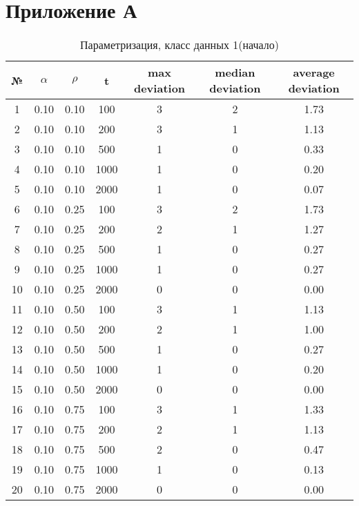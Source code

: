 \documentclass[a4paper, 12pt, unknownkeysallowed]{extreport}
\begin{document}
\chapter*{Приложение А}

\begin{center}
    \captionsetup{justification=raggedright,singlelinecheck=off}
    \begin{longtable}[c]{|c|c|c|c|c|c|c|}
    \caption{Параметризация, класс данных 1(начало)\label{tbl:p_1_1}} \\ \hline
		№ & $\alpha$ & $\rho$ & t & max deviation & median deviation & average deviation \\ \hline   
    1 & 0.10 & 0.10 &   100 &    3 &    2 &  1.73 \\ \hline
    2 & 0.10 & 0.10 &   200 &    3 &    1 &  1.13 \\ \hline
    3 & 0.10 & 0.10 &   500 &    1 &    0 &  0.33 \\ \hline
    4 & 0.10 & 0.10 &  1000 &    1 &    0 &  0.20 \\ \hline
    5 & 0.10 & 0.10 &  2000 &    1 &    0 &  0.07 \\ \hline
    6 & 0.10 & 0.25 &   100 &    3 &    2 &  1.73 \\ \hline
    7 & 0.10 & 0.25 &   200 &    2 &    1 &  1.27 \\ \hline
    8 & 0.10 & 0.25 &   500 &    1 &    0 &  0.27 \\ \hline
    9 & 0.10 & 0.25 &  1000 &    1 &    0 &  0.27 \\ \hline
   10 & 0.10 & 0.25 &  2000 &    0 &    0 &  0.00 \\ \hline
   11 & 0.10 & 0.50 &   100 &    3 &    1 &  1.13 \\ \hline
   12 & 0.10 & 0.50 &   200 &    2 &    1 &  1.00 \\ \hline
   13 & 0.10 & 0.50 &   500 &    1 &    0 &  0.27 \\ \hline
   14 & 0.10 & 0.50 &  1000 &    1 &    0 &  0.20 \\ \hline
   15 & 0.10 & 0.50 &  2000 &    0 &    0 &  0.00 \\ \hline
   16 & 0.10 & 0.75 &   100 &    3 &    1 &  1.33 \\ \hline
   17 & 0.10 & 0.75 &   200 &    2 &    1 &  1.13 \\ \hline
   18 & 0.10 & 0.75 &   500 &    2 &    0 &  0.47 \\ \hline
   19 & 0.10 & 0.75 &  1000 &    1 &    0 &  0.13 \\ \hline
   20 & 0.10 & 0.75 &  2000 &    0 &    0 &  0.00 \\ \hline

\end{longtable}
\end{center}
\end{document}

